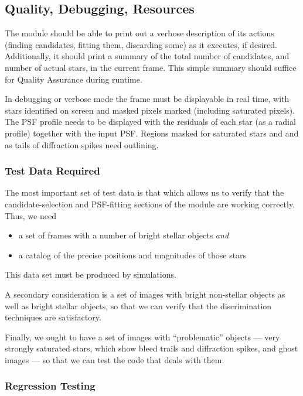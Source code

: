 \subsection{Quality, Debugging, Resources}

The module should be able to print out a verbose description of
its actions (finding candidates, fitting them, discarding some)
as it executes, if desired.
Additionally, it should print a summary of the total number of candidates,
and number of actual stars, in the current frame.
This simple summary should suffice for Quality Assurance during runtime.

In debugging or verbose mode the frame must be displayable in
real time, with
stars identified on screen and masked pixels marked (including saturated
pixels). The PSF profile needs to be displayed with the residuals of each star
(as a radial profile) together with the input PSF. Regions masked
for saturated stars and and as tails of diffraction spikes need outlining.

\subsubsection {Test Data Required}

The most important set of test data is that which allows us to
verify that the candidate-selection and PSF-fitting sections of
the module are working correctly.  Thus, we need

\begin{itemize}
  \item a set of frames with a number of bright stellar objects {\it and}
  \item a catalog of the precise positions and magnitudes of those stars
\end{itemize}

This data set must be produced by simulations.

A secondary consideration is a set of images with bright non-stellar
objects as well as bright stellar objects, so that we can verify that
the discrimination techniques are satisfactory.

Finally, we ought to have a set of images with ``problematic''
objects --- very strongly saturated stars, which show bleed trails
and diffraction spikes, and ghost images --- so that we can test
the code that deals with them.

\subsubsection {Regression Testing}

